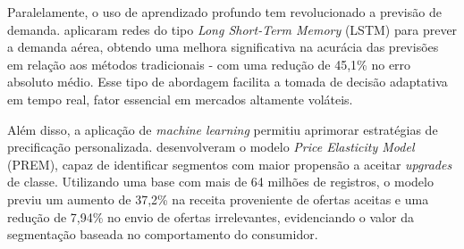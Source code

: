 Paralelamente, o uso de aprendizado profundo tem revolucionado a previsão de demanda. \citet{HE2023109707} aplicaram redes do tipo \textit{Long Short-Term Memory} (LSTM) para prever a demanda aérea, obtendo uma melhora significativa na acurácia das previsões em relação aos métodos tradicionais - com uma redução de 45,1\% no erro absoluto médio. Esse tipo de abordagem facilita a tomada de decisão adaptativa em tempo real, fator essencial em mercados altamente voláteis.

Além disso, a aplicação de \textit{machine learning} permitiu aprimorar estratégias de precificação personalizada. \citet{THIRUMURUGANATHAN2023103759} desenvolveram o modelo \textit{Price Elasticity Model} (PREM), capaz de identificar segmentos com maior propensão a aceitar \textit{upgrades} de classe. Utilizando uma base com mais de 64 milhões de registros, o modelo previu um aumento de 37,2\% na receita proveniente de ofertas aceitas e uma redução de 7,94\% no envio de ofertas irrelevantes, evidenciando o valor da segmentação baseada no comportamento do consumidor.



